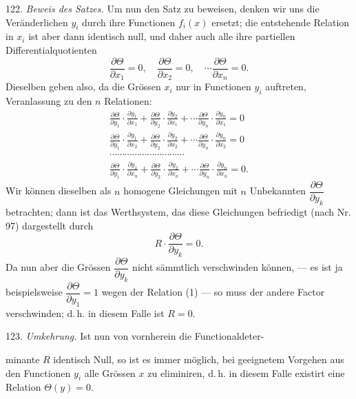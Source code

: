 \documentclass[11pt]{article}
\providecommand{\weberpage}[1]{}
\let\Theta\varTheta
\begin{document}
122. \textit{Beweis des Satzes.} Um nun den Satz zu beweisen, denken wir uns die Veränderlichen $y_i$ durch ihre Functionen $f_i(x)$ ersetzt; die entstehende Relation in $x_i$ ist aber dann identisch null, und daher auch alle ihre partiellen Differentialquotienten
\[
\frac{\partial \Theta}{\partial x_1} = 0, \quad \frac{\partial \Theta}{\partial x_2} = 0, \quad \cdots \frac{\partial \Theta}{\partial x_n} = 0.
\]
Dieselben geben also, da die Grössen $x_i$ nur in Functionen $y_i$ auftreten, Veranlassung zu den $n$ Relationen:
\begin{gather*}
\frac{\partial \Theta}{\partial y_1} \cdot \frac{\partial y_1}{\partial x_1} + \frac{\partial \Theta}{\partial y_2} \cdot \frac{\partial y_2}{\partial x_1} + \cdots \frac{\partial \Theta}{\partial y_n} \cdot \frac{\partial y_n}{\partial x_1} = 0 \\
\frac{\partial \Theta}{\partial y_1} \cdot \frac{\partial y_1}{\partial x_2} + \frac{\partial \Theta}{\partial y_2} \cdot \frac{\partial y_2}{\partial x_2} + \cdots \frac{\partial \Theta}{\partial y_n} \cdot \frac{\partial y_n}{\partial x_2} = 0 \\
\cdots\cdots\cdots\cdots\cdots\cdots\cdots\cdots\cdots\cdots \\
\frac{\partial \Theta}{\partial y_1} \cdot \frac{\partial y_1}{\partial x_n} + \frac{\partial \Theta}{\partial y_2} \cdot \frac{\partial y_2}{\partial x_n} + \cdots \frac{\partial \Theta}{\partial y_n} \cdot \frac{\partial y_n}{\partial x_n} = 0.
\end{gather*}
Wir können dieselben als $n$ homogene Gleichungen mit $n$ Unbekannten $\dfrac{\partial \Theta}{\partial y_k}$ betrachten; dann ist das Werthsystem, das diese Gleichungen befriedigt (nach Nr. 97) dargestellt durch
\[
R \cdot \frac{\partial \Theta}{\partial y_k} = 0.
\]
Da nun aber die Grössen $\dfrac{\partial \Theta}{\partial y_k}$ nicht sämmtlich verschwinden können, — es ist ja beispielsweise $\dfrac{\partial \Theta}{\partial y_1} = 1$ wegen der Relation (1) — so muss der andere Factor verschwinden; d.\,h. in diesem Falle ist $R = 0$.

123. \textit{Umkehrung.} Ist nun von vornherein die Functionaldeter-


\weberpage{130}

minante $R$ identisch Null, so ist es immer möglich, bei geeignetem Vorgehen aus den Functionen $y_i$ alle Grössen $x$ zu eliminiren, d.\,h. in diesem Falle existirt eine Relation $\Theta(y) = 0$.
\end{document}
